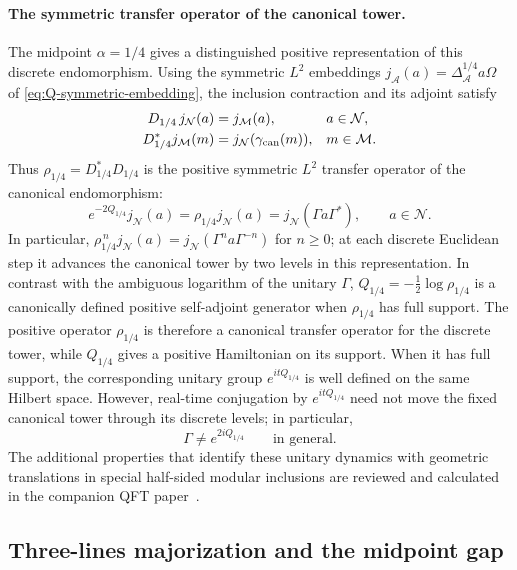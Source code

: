 \documentclass[a4paper,11pt]{article}
\theoremstyle{definition}
\newcommand{\mA}{\mathcal{A}}
\newcommand{\mN}{\mathcal{N}}
\newcommand{\mM}{\mathcal{M}}
\begin{document}
\paragraph{The symmetric transfer operator of the canonical tower.}
The midpoint $\alpha=1/4$ gives a distinguished positive representation
of this discrete endomorphism. Using the symmetric $L^2$ embeddings
$j_{\mA}(a)=\Delta_{\mA}^{1/4}a\Omega$ of
\eqref{eq:Q-symmetric-embedding}, the inclusion contraction and its
adjoint satisfy
\begin{equation}
 \begin{aligned}
 D_{1/4}\,j_{\mN}(a)&=j_{\mM}(a),&&a\in\mN,\\
 D_{1/4}^*j_{\mM}(m)&=j_{\mN}(\gamma_{\rm can}(m)),&&m\in\mM.
 \end{aligned}
 \label{eq:canonical-L2-adjoint}
\end{equation}
Thus $\rho_{1/4}=D_{1/4}^*D_{1/4}$ is the positive symmetric
$L^2$ transfer operator of the canonical endomorphism:
\begin{equation}
 \boxed{\quad
 e^{-2Q_{1/4}}j_{\mN}(a)
 =\rho_{1/4}j_{\mN}(a)
 =j_{\mN}(\Gamma a\Gamma^*),\qquad a\in\mN.\quad}
 \label{eq:canonical-L2-transfer}
\end{equation}
In particular, $\rho_{1/4}^{\,n}j_{\mN}(a)
=j_{\mN}(\Gamma^n a\Gamma^{-n})$ for $n\geq0$; at each discrete
Euclidean step it advances the canonical tower by two levels in this
representation. In contrast with the ambiguous logarithm of the unitary
$\Gamma$, $Q_{1/4}=-\tfrac12\log\rho_{1/4}$ is a canonically defined
positive self-adjoint generator when $\rho_{1/4}$ has full support.
The positive operator $\rho_{1/4}$ is therefore a canonical transfer operator for the discrete tower, while $Q_{1/4}$ gives a positive Hamiltonian on its support. When it has full support, the corresponding unitary group $e^{itQ_{1/4}}$ is well defined on the same Hilbert space. However, real-time conjugation by $e^{itQ_{1/4}}$ need not move the fixed canonical tower through its discrete levels; in particular,
\begin{equation}
 \Gamma\neq e^{2iQ_{1/4}}\qquad\text{in general}.
 \label{eq:canonical-not-unitary-interpolation}
\end{equation}
The additional properties that identify these unitary dynamics with geometric translations in special half-sided modular inclusions are reviewed and calculated in the companion QFT paper~\cite{companionQFT}.

\subsection{Three-lines majorization and the midpoint gap}
\label{subsec:Q-three-lines}
\end{document}
